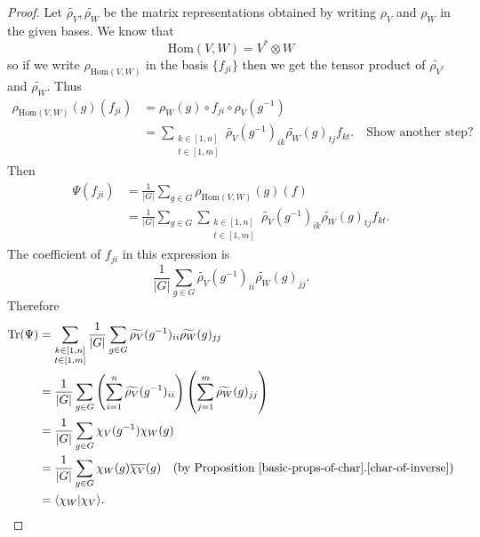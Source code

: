 \begin{proof}
Let $\widetilde{\rho_V}, \widetilde{\rho_W}$ be the matrix representations obtained by writing $\rho_V$ and $\rho_W$ in the given bases.  We know that 
\[ \text{Hom}(V,W) = V^* \otimes W \]
so if we write $\rho_{\text{Hom}(V,W)}$ in the basis $\{ f_{ji} \}$ then we get the tensor product of  $\widetilde{\rho_{V^*}}$ and $\widetilde{\rho_W}$.  Thus
\begin{align*}
\rho_{\text{Hom}(V,W)}(g)(f_{ji}) &= \rho_W (g) \circ f_{ji} \circ \rho_V (g^{-1}) \\
&= \sum_{\substack{k \in [1,n] \\  t \in [1,m]}} \widetilde{\rho_V} (g^{-1})_{ik} \widetilde{\rho_W}(g)_{tj} f_{kt}. \quad \text{Show another step?}
\end{align*}
Then 
\begin{align*}
\Psi (f_{ji}) &= \frac{1}{|G|} \sum_{g \in G} \rho_{\text{Hom}(V,W)}(g)(f) \\
&= \frac{1}{|G|} \sum_{g \in G} \sum_{\substack{k \in [1,n] \\  t \in [1,m]}} \widetilde{\rho_V} (g^{-1})_{ik} \widetilde{\rho_W}(g)_{tj} f_{kt}.
\end{align*}
The coefficient of $f_{ji}$ in this expression is
\[ \frac{1}{|G|} \sum_{g \in G}\widetilde{\rho_V} (g^{-1})_{ii} \widetilde{\rho_W}(g)_{jj}. \]
Therefore
\begin{align*}
\text{Tr} (\Psi) &= \sum_{\substack{k \in [1,n] \\  t \in [1,m]}}  \frac{1}{|G|} \sum_{g \in G}\widetilde{\rho_V} (g^{-1})_{ii} \widetilde{\rho_W}(g)_{jj} \\
&=  \frac{1}{|G|} \sum_{g \in G} \left( \sum_{i=1}^n \widetilde{\rho_V}(g^{-1})_{ii} \right) \left( \sum_{j=1}^m \widetilde{\rho_W} (g)_{jj} \right) \\
&= \frac{1}{|G|} \sum_{g \in G} \chi_V (g^{-1}) \chi_W (g) \\
&= \frac{1}{|G|} \sum_{g \in G} \chi_W (g) \overline{\chi_V}(g)  \quad \text{(by Proposition \ref{basic-props-of-char}.\ref{char-of-inverse})}\\
&= \langle \chi_W | \chi_V \rangle.
\end{align*}
\end{proof}

